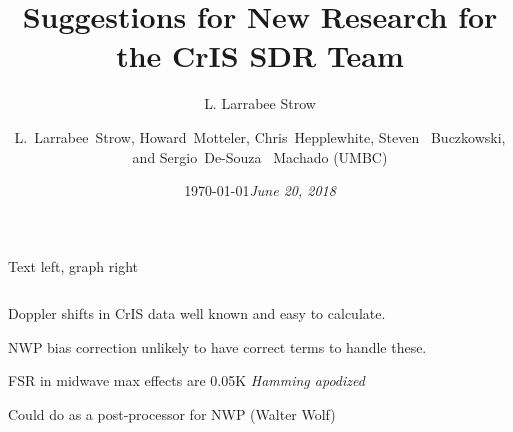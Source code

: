 \documentclass[10pt,t]{beamer}
\author{L. Larrabee Strow}
\date{\today}
\title{\large Suggestions for New Research for the CrIS SDR Team}
\date{\textit{\footnotesize June 20, 2018}}
\author{L.~Larrabee~Strow, Howard~Motteler, Chris~Hepplewhite, Steven  ~Buczkowski, and Sergio~De-Souza~ Machado (UMBC)}
\begin{document}
\maketitle
{}
\begin{frame}[label={sec:orga1772ec}]{Text left, graph right}
  \vspace{-0.2in}

  \begin{columns}
    \begin{column}{0.55\columnwidth}
      \begin{block}{}
        \vspace{0.05in}

        \small Doppler shifts in CrIS data well known and easy to calculate.  

        \vspace{0.05in}

        \small NWP bias correction unlikely to have correct terms to handle these.

        \vspace{0.05in}

        \small FSR in midwave max effects are \textpm{}0.05K \emph{Hamming apodized}

        \vspace{0.05in}

        \small Could do as a post-processor for NWP (Walter Wolf)


\end{block}
\end{column}
\end{columns}
\end{frame}
\end{document}
